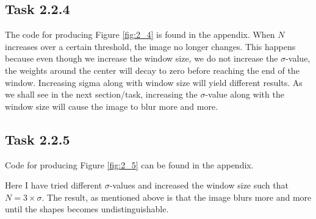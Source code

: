 \subsection{Task 2.2.4}
The code for producing Figure \ref{fig:2_4} is found in the appendix. When $N$
increases over a certain threshold, the image no longer changes.  This happens
because even though we increase the window size, we do not increase the
$\sigma$-value, the weights around the center will decay to zero before reaching
the end of the window. Increasing sigma along with window size will yield
different results. As we shall see in the next section/task, increasing the
$\sigma$-value along with the window size will cause the image to blur more and
more.



\subsection{Task 2.2.5}
Code for producing Figure \ref{fig:2_5} can be found in the appendix.

Here I have tried different $\sigma$-values and increased the window size such
that $N = 3\times\sigma$.  The result, as mentioned above is that the image
blurs more and more until the shapes becomes undistinguishable.

